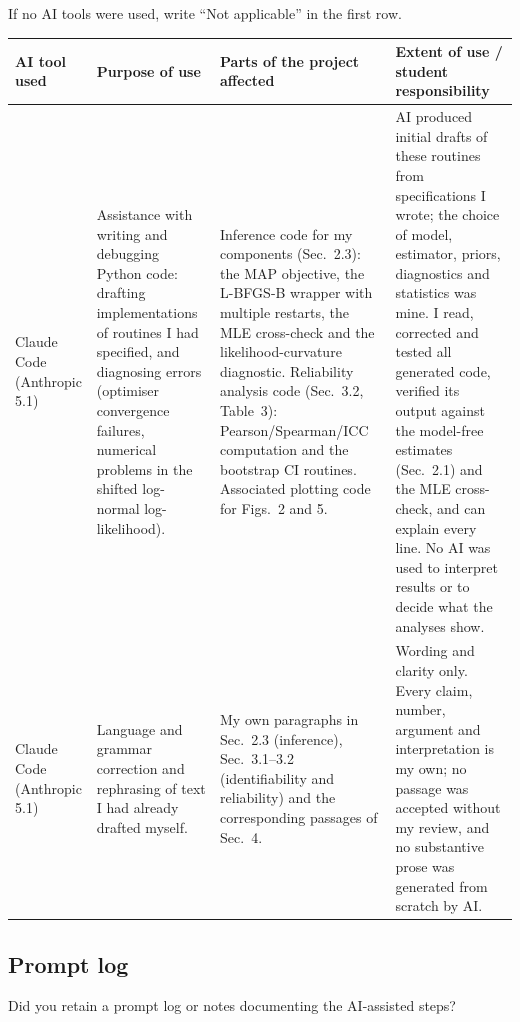 \documentclass[11pt]{article}
\begin{document}
If no AI tools were used, write ``Not applicable'' in the first row.

\medskip

\begin{tabularx}{\textwidth}{|
>{\raggedright\arraybackslash}X|
>{\raggedright\arraybackslash}X|
>{\raggedright\arraybackslash}X|
>{\raggedright\arraybackslash}X|}
\hline
\textbf{AI tool used} &
\textbf{Purpose of use} &
\textbf{Parts of the project affected} &
\textbf{Extent of use / student responsibility} \\
\hline
Claude Code (Anthropic 5.1) &
Assistance with writing and debugging Python code: drafting implementations of
routines I had specified, and diagnosing errors (optimiser convergence failures,
numerical problems in the shifted log-normal log-likelihood). &
Inference code for my components (Sec.~2.3): the MAP objective, the L-BFGS-B
wrapper with multiple restarts, the MLE cross-check and the likelihood-curvature
diagnostic. Reliability analysis code (Sec.~3.2, Table~3): Pearson/Spearman/ICC
computation and the bootstrap CI routines. Associated plotting code for
Figs.~2 and 5. &
AI produced initial drafts of these routines from specifications I wrote; the
choice of model, estimator, priors, diagnostics and statistics was mine.
I read, corrected and tested all generated code, verified its output against
the model-free estimates (Sec.~2.1) and the MLE cross-check, and can explain
every line. No AI was used to interpret results or to decide what the analyses
show. \\
[2.5em]
\hline
Claude Code (Anthropic 5.1) &
Language and grammar correction and rephrasing of text I had already drafted
myself. &
My own paragraphs in Sec.~2.3 (inference), Sec.~3.1--3.2 (identifiability and
reliability) and the corresponding passages of Sec.~4. &
Wording and clarity only. Every claim, number, argument and interpretation is my
own; no passage was accepted without my review, and no substantive prose was
generated from scratch by AI. \\
[2.5em]
\hline
\end{tabularx}

\bigskip

\subsection*{Prompt log}

\noindent
Did you retain a prompt log or notes documenting the AI-assisted steps?

\medskip
\end{document}

